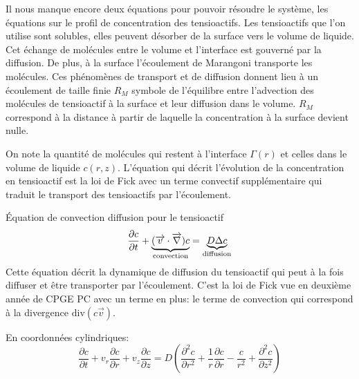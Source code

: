 \documentclass[french, 10pt]{article}
\begin{document}


Il nous manque encore deux équations pour pouvoir résoudre le système, les équations sur le profil de concentration des tensioactifs. Les tensioactifs que l'on utilise sont solubles, elles peuvent désorber de la surface vers le volume de liquide. Cet échange de molécules entre le volume et l'interface est gouverné par la diffusion. De plus, à la surface l'écoulement de Marangoni transporte les molécules. Ces phénomènes de transport et de diffusion donnent lieu à un écoulement de taille finie $R_M$ symbole de l'équilibre entre l'advection des molécules de tensioactif à la surface et leur diffusion dans le volume. $R_M$ correspond à la distance à partir de laquelle la concentration à la surface devient nulle.\bigskip 


On note la quantité de molécules qui restent à l'interface $\Gamma(r)$ et celles dans le volume de liquide $c(r,z)$. L'équation qui décrit l'évolution de la concentration en tensioactif est la loi de Fick avec un terme convectif supplémentaire qui traduit le transport des tensioactifs par l'écoulement.\medskip

\begin{Programme}{Équation de convection diffusion pour le tensioactif}
  \begin{equation}
    \dfrac{\partial c}{\partial t}+ \underbrace{(\vec{v}\cdot \vec{\nabla})c}_{\text{convection}}=\underbrace{D\Delta c}_{\rm diffusion}
  \end{equation}
  Cette équation décrit la dynamique de diffusion du tensioactif qui peut à la fois diffuser et être transporter par l'écoulement. C'est la loi de Fick vue en deuxième année de CPGE PC avec un terme en plus: le terme de convection qui correspond à la divergence $\text{div}(c\vec{v})$.
\end{Programme} 
% 
En coordonnées cylindriques:
\begin{equation}
  \frac{\partial c}{\partial t}+v_r\frac{\partial c}{\partial r}+v_z\frac{\partial c}{\partial z}=D\left(\frac{\partial ^2 c}{\partial r^2}+\frac{1}{r}\frac{\partial c}{\partial r}-\frac{c}{r^2}+\frac{\partial ^2 c}{\partial z^2}\right)\label{eq:transporttensioactif}
  \end{equation}
\end{document}
